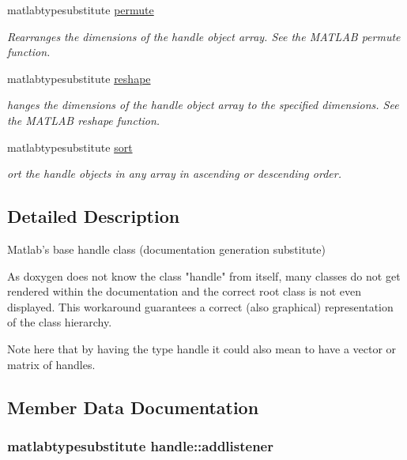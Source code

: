 \begin{DoxyCompactItemize}
matlabtypesubstitute \hyperlink{classhandle_a6dc9f59313af54f392d8e273d71ace7b}{permute}
\begin{DoxyCompactList}\small\item\em Rearranges the dimensions of the handle object array. See the M\-A\-T\-L\-A\-B permute function. \end{DoxyCompactList}\item 
matlabtypesubstitute \hyperlink{classhandle_acef58ae5e52255411835a4fcaf2edd49}{reshape}
\begin{DoxyCompactList}\small\item\em hanges the dimensions of the handle object array to the specified dimensions. See the M\-A\-T\-L\-A\-B reshape function. \end{DoxyCompactList}\item 
matlabtypesubstitute \hyperlink{classhandle_ad11b0be4c173a9d31122c1298eb96a97}{sort}
\begin{DoxyCompactList}\small\item\em ort the handle objects in any array in ascending or descending order. \end{DoxyCompactList}\end{DoxyCompactItemize}


\subsection{Detailed Description}
Matlab's base handle class (documentation generation substitute) 

\begin{DoxyVerb}          As doxygen does not know the class "handle" from itself, many classes do not get rendered within the documentation and the correct root class is not even displayed.
          This workaround guarantees a correct (also graphical) representation of the class hierarchy.\end{DoxyVerb}
 Note here that by having the type handle it could also mean to have a vector or matrix of handles. 

\subsection{Member Data Documentation}
\hypertarget{classhandle_aa72d46799b8792edbf8acb7349680c15}{
\subsubsection[{addlistener}]{\setlength{\rightskip}{0pt plus 5cm}matlabtypesubstitute {\bf handle\-::addlistener}}}\label{classhandle_aa72d46799b8792edbf8acb7349680c15}


